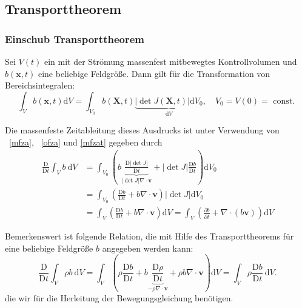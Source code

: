 \documentclass[
	11pt, %
]{beamer}
\begin{document}
		\subsection{Transporttheorem}
\begin{frame}
	\frametitle{Einschub Transporttheorem}
  Sei $V(t)$ ein mit der Strömung massenfest mitbewegtes Kontrollvolumen und $b(\mathbf{x}, t)$ eine beliebige Feldgröße. Dann gilt für die Transformation von Bereichsintegralen:
$$
\int_V b(\mathbf{x}, t) \mathrm{d} V=\int_{V_0} b(\mathbf{X}, t) \underbrace{|\operatorname{det} J(\mathbf{X}, t)| \mathrm{d} V_0}_{\mathrm{d} V}, \quad V_0=V(0)=\text { const. }
$$

  Die massenfeste Zeitableitung dieses Ausdrucks ist unter Verwendung von ~\eqref{mfza},  ~\eqref{ofza} und \eqref{mfzat} gegeben durch
$$
\begin{aligned}
\frac{\mathrm{D}}{\mathrm{D} t} \int_V b \mathrm{~d} V & =\int_{V_0}(b \underbrace{\frac{\mathrm{D}|\operatorname{det} J|}{\mathrm{D} t}}_{|\operatorname{det} J| \nabla \cdot \mathbf{v}}+|\operatorname{det} J| \frac{\mathrm{D} b}{\mathrm{D} t}) \mathrm{d} V_0\\
  & =\int_{V_0}\left(\frac{\mathrm{D} b}{\mathrm{D} t}+b \nabla \cdot \mathbf{v}\right)|\operatorname{det} J| \mathrm{d} V_0 \\
& =\int_V\left(\frac{\mathrm{D} b}{\mathrm{D} t}+b \nabla \cdot \mathbf{v}\right) \mathrm{d} V=\int_V\left(\frac{\partial b}{\partial t}+\nabla \cdot(b \mathbf{v})\right) \mathrm{d} V
\end{aligned}
$$

\end{frame}
\begin{frame}
  Bemerkenswert ist folgende Relation, die mit Hilfe des Transporttheorems für eine beliebige Feldgröße $b$ angegeben werden kann:
$$
  \frac{\mathrm{D}}{\mathrm{D} t} \int_V \rho b \mathrm{~d} V=\int_V(\rho \frac{\mathrm{D} b}{\mathrm{D} t}+b \underbrace{\frac{\mathrm{D} \rho}{\mathrm{D} t}}_{-\rho \nabla \cdot \mathbf{v}}+\rho b \nabla \cdot \mathbf{v}) \mathrm{d} V=\int_V \rho \frac{\mathrm{D} b}{\mathrm{D} t} \mathrm{~d} V . \label{tt}
$$
 die wir f\"ur die Herleitung der Bewegungsgleichung ben\"otigen.
\end{frame}
%	
\end{document}
